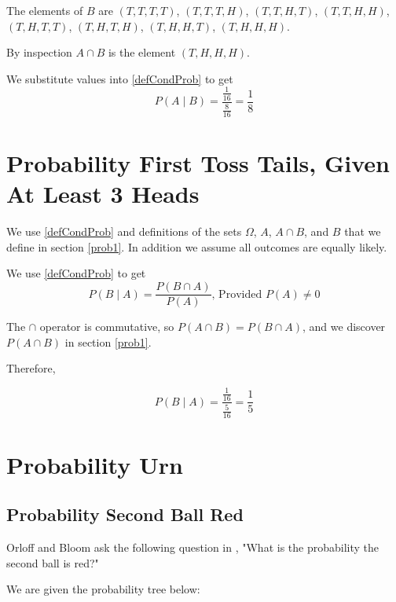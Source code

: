 \documentclass[a4paper,11pt]{article}
\begin{document}
The elements of $B$ are $ \left(T, T, T, T \right) $,
$ \left(T, T, T, H \right) $, $ \left(T, T, H, T \right) $,
$ \left(T, T, H, H \right) $, $ \left(T, H, T, T \right) $,
$ \left(T, H, T, H \right) $, $ \left(T, H, H, T \right) $,
$ \left(T, H, H, H \right) $.

By inspection $ A \cap B $ is the element $\left( T, H, H, H \right)$.

We substitute values into \ref{defCondProb} to get
\begin{equation}
  P \left( A \mid B \right) = \frac {\frac{1}{16}} {\frac{8}{16}} = 
    \frac{1}{8}
\end{equation}

\section{Probability First Toss Tails, Given At Least 3 Heads}

We use \ref{defCondProb} and definitions of the sets $\Omega$, $A$, 
$A \cap B$, and $B$ that we define in section \ref{prob1}. In addition
we assume all outcomes are equally likely.

We use \ref{defCondProb} to get
\begin{equation}
P \left( B \mid A \right) = \frac{P \left( B \cap A \right)}
  { P \left( A \right) } \text{, Provided } P\left( A \right) \neq 0
\end{equation}

The $\cap$ operator is commutative, so $P \left( A \cap B \right)
 = P \left( B \cap A \right)$, and we discover 
 $P \left( A \cap B \right)$ in section \ref{prob1}.
 
Therefore,

\begin{equation}
P \left( B \mid A \right) = \frac{ \frac{1}{16} }{ \frac{5}{16} }
  = \frac{1}{5}
\end{equation}

\section{Probability Urn}
\subsection{Probability Second Ball Red}

Orloff and Bloom ask the following question in \cite{slides3}, "What is 
the probability the second ball is red?"

We are given the probability tree below:
\end{document}
